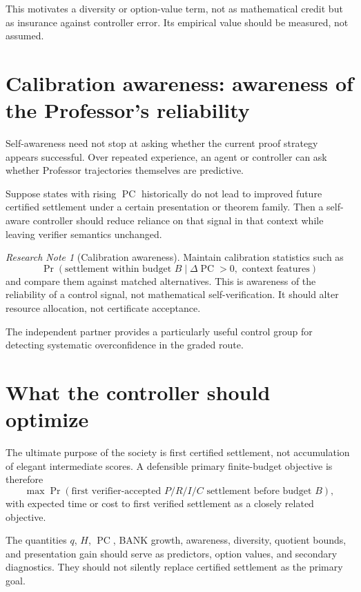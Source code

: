 \documentclass[11pt]{article}
\theoremstyle{definition}
\theoremstyle{remark}
\newtheorem{researchnote}[theorem]{Research Note}
\newcommand{\PC}{\operatorname{PC}}
\begin{document}
This motivates a diversity or option-value term, not as mathematical credit but as insurance against controller error. Its empirical value should be measured, not assumed.

\section{Calibration awareness: awareness of the Professor's reliability}

Self-awareness need not stop at asking whether the current proof strategy appears successful. Over repeated experience, an agent or controller can ask whether Professor trajectories themselves are predictive.

Suppose states with rising $\PC$ historically do not lead to improved future certified settlement under a certain presentation or theorem family. Then a self-aware controller should reduce reliance on that signal in that context while leaving verifier semantics unchanged.

\begin{researchnote}[Calibration awareness]
Maintain calibration statistics such as
\[
\Pr(\text{settlement within budget }B\mid \Delta\PC>0,\text{ context features})
\]
and compare them against matched alternatives. This is awareness of the reliability of a control signal, not mathematical self-verification. It should alter resource allocation, not certificate acceptance.
\end{researchnote}

The independent partner provides a particularly useful control group for detecting systematic overconfidence in the graded route.

\section{What the controller should optimize}

The ultimate purpose of the society is first certified settlement, not accumulation of elegant intermediate scores. A defensible primary finite-budget objective is therefore
\[
\boxed{
\max \Pr(\text{first verifier-accepted }P/R/I/C\text{ settlement before budget }B),
}
\]
with expected time or cost to first verified settlement as a closely related objective.

The quantities $q$, $H$, $\PC$, BANK growth, awareness, diversity, quotient bounds, and presentation gain should serve as predictors, option values, and secondary diagnostics. They should not silently replace certified settlement as the primary goal.
\end{document}
